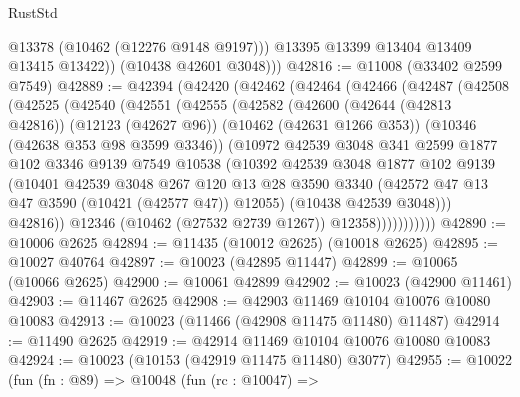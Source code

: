 \begin{lexlean}{RustStd}
\begin{coremodule}
              @13378
              (@10462 (@12276 @9148 @9197)))
            @13395
            @13399
            @13404
            @13409
            @13415
            @13422))
        (@10438 @42601 @3048)))
@42816 := @11008 (@33402 @2599 @7549)
@42889 := @42394
    (@42420
      (@42462
        (@42464
          (@42466
            (@42487
              (@42508
                (@42525
                  (@42540
                    (@42551
                      (@42555
                        (@42582
                          (@42600
                            (@42644 (@42813 @42816))
                            (@12123 (@42627 @96))
                            (@10462 (@42631 @1266 @353))
                            (@10346 (@42638 @353 @98 @3599 @3346))
                            (@10972
                              @42539
                              @3048
                              @341
                              @2599
                              @1877
                              @102
                              @3346
                              @9139
                              @7549
                              @10538
                              (@10392
                                @42539
                                @3048
                                @1877
                                @102
                                @9139
                                (@10401
                                  @42539
                                  @3048
                                  @267
                                  @120
                                  @13
                                  @28
                                  @3590
                                  @3340
                                  (@42572 @47 @13 @47 @3590 (@10421 (@42577 @47)) @12055)
                                  (@10438 @42539 @3048)))
                              @42816))
                          @12346
                          (@10462 (@27532 @2739 @1267))
                          @12358)))))))))))
@42890 := @10006 @2625
@42894 := @11435 (@10012 @2625) (@10018 @2625)
@42895 := @10027 @40764
@42897 := @10023 (@42895 @11447)
@42899 := @10065 (@10066 @2625)
@42900 := @10061 @42899
@42902 := @10023 (@42900 @11461)
@42903 := @11467 @2625
@42908 := @42903 @11469 @10104 @10076 @10080 @10083
@42913 := @10023 (@11466 (@42908 @11475 @11480) @11487)
@42914 := @11490 @2625
@42919 := @42914 @11469 @10104 @10076 @10080 @10083
@42924 := @10023 (@10153 (@42919 @11475 @11480) @3077)
@42955 := @10022
    (fun (fn : @89) =>
    @10048
      (fun (rc : @10047) =>

\end{coremodule}
\end{lexlean}

